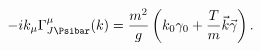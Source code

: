 \begin{equation}
\label{eq:gamma_low}
-ik_\mu\Gamma_{J\smash[t]{\Psibar}}^\mu(k)=\frac{m^2}{g}
\left(k_0\gamma_0+\frac{T}{m}\vec k\vec\gamma\right).
\end{equation}

